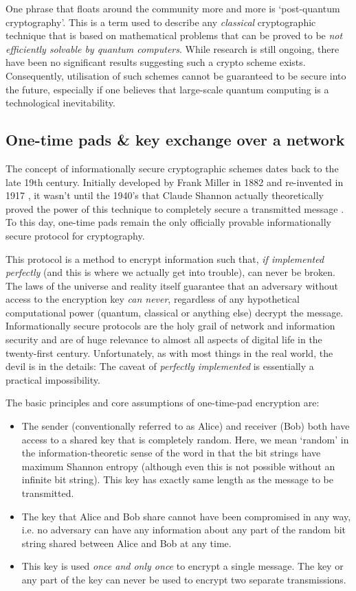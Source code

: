 \documentclass[twocolumn, aps, rmp, amsmath, amssymb, nofootinbib, superscriptaddress, longbibliography, floatfix, table-of-contents, eqsecnum]{revtex4-2}
\begin{document}
One phrase that floats around the community more and more is `post-quantum cryptography'. This is a term used to describe any \textit{classical} cryptographic technique that is based on mathematical problems that can be proved to be \textit{not efficiently solvable by quantum computers}. While research is still ongoing, there have been no significant results suggesting such a crypto scheme exists. Consequently, utilisation of such schemes cannot be guaranteed to be secure into the future, especially if one believes that large-scale quantum computing is a technological inevitability. 

\subsection{One-time pads \& key exchange over a network}

The concept of informationally secure cryptographic schemes dates back to the late 19th century. Initially developed by Frank Miller in 1882 \cite{?} and re-invented in 1917 \cite{?}, it wasn't until the 1940's that Claude Shannon actually theoretically proved the power of this technique to completely secure a transmitted message \cite{?}. To this day, one-time pads remain the only officially provable informationally secure protocol for cryptography. 

This protocol is a method to encrypt information such that, \textit{if implemented perfectly} (and this is where we actually get into trouble), can never be broken. The laws of the universe and reality itself guarantee that an adversary without access to the encryption key \textit{can never}, regardless of any hypothetical computational power (quantum, classical or anything else) decrypt the message. Informationally secure protocols are the holy grail of network and information security and are of huge relevance to almost all aspects of digital life in the twenty-first century. Unfortunately, as with most things in the real world, the devil is in the details: The caveat of \textit{perfectly implemented} is essentially a practical impossibility. 

The basic principles and core assumptions of one-time-pad encryption are:
\begin{itemize}
\item The sender (conventionally referred to as Alice) and receiver (Bob) both have access to a shared key that is completely random. Here, we mean `random' in the information-theoretic sense of the word in that the bit strings have maximum Shannon entropy (although even this is not possible without an infinite bit string). This key has exactly same length as the message to be transmitted.
\item The key that Alice and Bob share cannot have been compromised in any way, i.e. no adversary can have any information about any part of the random bit string shared between Alice and Bob at any time.
\item This key is used \textit{once and only once} to encrypt a single message. The key or any part of the key can never be used to encrypt two separate transmissions.
\end{itemize}
\end{document}
